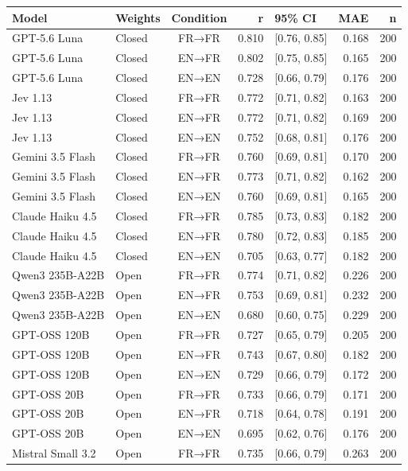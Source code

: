 \begin{tabular}{llcrlrr}
\hline
\textbf{Model} & \textbf{Weights} & \textbf{Condition} & \textbf{r} & \textbf{95\% CI} & \textbf{MAE} & \textbf{n} \\
\hline
GPT-5.6 Luna & Closed & FR→FR & 0.810 & [0.76, 0.85] & 0.168 & 200 \\
GPT-5.6 Luna & Closed & EN→FR & 0.802 & [0.75, 0.85] & 0.165 & 200 \\
GPT-5.6 Luna & Closed & EN→EN & 0.728 & [0.66, 0.79] & 0.176 & 200 \\
Jev 1.13 & Closed & FR→FR & 0.772 & [0.71, 0.82] & 0.163 & 200 \\
Jev 1.13 & Closed & EN→FR & 0.772 & [0.71, 0.82] & 0.169 & 200 \\
Jev 1.13 & Closed & EN→EN & 0.752 & [0.68, 0.81] & 0.176 & 200 \\
Gemini 3.5 Flash & Closed & FR→FR & 0.760 & [0.69, 0.81] & 0.170 & 200 \\
Gemini 3.5 Flash & Closed & EN→FR & 0.773 & [0.71, 0.82] & 0.162 & 200 \\
Gemini 3.5 Flash & Closed & EN→EN & 0.760 & [0.69, 0.81] & 0.165 & 200 \\
Claude Haiku 4.5 & Closed & FR→FR & 0.785 & [0.73, 0.83] & 0.182 & 200 \\
Claude Haiku 4.5 & Closed & EN→FR & 0.780 & [0.72, 0.83] & 0.185 & 200 \\
Claude Haiku 4.5 & Closed & EN→EN & 0.705 & [0.63, 0.77] & 0.182 & 200 \\
Qwen3 235B-A22B & Open & FR→FR & 0.774 & [0.71, 0.82] & 0.226 & 200 \\
Qwen3 235B-A22B & Open & EN→FR & 0.753 & [0.69, 0.81] & 0.232 & 200 \\
Qwen3 235B-A22B & Open & EN→EN & 0.680 & [0.60, 0.75] & 0.229 & 200 \\
GPT-OSS 120B & Open & FR→FR & 0.727 & [0.65, 0.79] & 0.205 & 200 \\
GPT-OSS 120B & Open & EN→FR & 0.743 & [0.67, 0.80] & 0.182 & 200 \\
GPT-OSS 120B & Open & EN→EN & 0.729 & [0.66, 0.79] & 0.172 & 200 \\
GPT-OSS 20B & Open & FR→FR & 0.733 & [0.66, 0.79] & 0.171 & 200 \\
GPT-OSS 20B & Open & EN→FR & 0.718 & [0.64, 0.78] & 0.191 & 200 \\
GPT-OSS 20B & Open & EN→EN & 0.695 & [0.62, 0.76] & 0.176 & 200 \\
Mistral Small 3.2 & Open & FR→FR & 0.735 & [0.66, 0.79] & 0.263 & 200 \\

\end{tabular}
